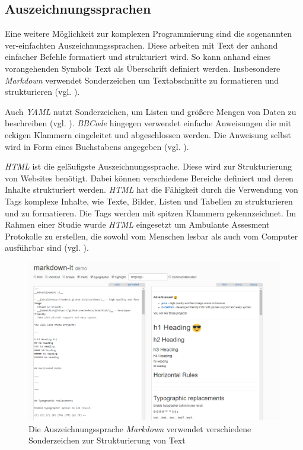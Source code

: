 \subsection{Auszeichnungssprachen}
Eine weitere Möglichkeit zur komplexen Programmierung sind die sogenannten ver-einfachten Auszeichnungssprachen. Diese arbeiten mit Text der anhand einfacher Befehle formatiert und strukturiert wird. So kann anhand eines vorangehenden Symbols Text als Überschrift definiert werden. Insbesondere \emph{Markdown} verwendet Sonderzeichen um Textabschnitte zu formatieren und strukturieren (vgl. \cite{GettingS56:online}).

Auch \emph{YAML} nutzt Sonderzeichen, um Listen und größere Mengen von Daten zu beschreiben (vgl. \cite{TheOffic64:online}). \emph{BBCode} hingegen verwendet einfache Anweisungen die mit eckigen Klammern eingeleitet und abgeschlossen werden. Die Anweisung selbst wird in Form eines Buchstabens angegeben (vgl. \cite{BBCodeor24:online}).

\emph{HTML} ist die geläufigste Auszeichnungssprache. Diese wird zur Strukturierung von Websites benötigt. Dabei können verschiedene Bereiche definiert und deren Inhalte strukturiert werden. \emph{HTML} hat die Fähigkeit durch die Verwendung von Tags komplexe Inhalte, wie Texte, Bilder, Listen und Tabellen zu strukturieren und zu formatieren. Die Tags werden mit spitzen Klammern gekennzeichnet. Im Rahmen einer Studie wurde \emph{HTML} eingesetzt um Ambulante Assesment Protokolle zu erstellen, die sowohl vom Menschen lesbar als auch vom Computer ausführbar sind (vgl. \cite{Batalas2018}).

\begin{figure}[h]
\centering
\includegraphics[width=1\textwidth]{pictures/markdown}
\caption{Die Auszeichnungssprache \emph{Markdown} verwendet verschiedene Sonderzeichen zur Strukturierung von Text}
\label{markdown}
\end{figure}



